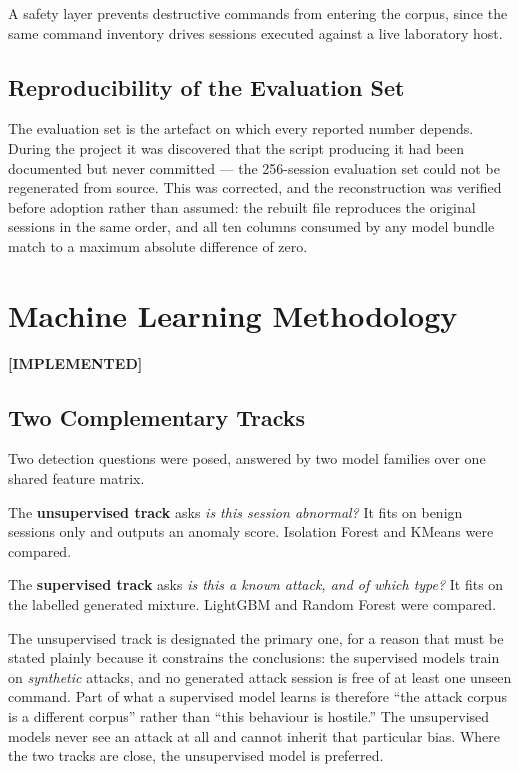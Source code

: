 \documentclass{classeENS}
\providecommand{\statusdone}{\textbf{[IMPLEMENTED]}}
\begin{document}
A safety layer prevents destructive commands from entering the corpus, since the same command inventory drives sessions executed against a live laboratory host.

\subsection{Reproducibility of the Evaluation Set}
The evaluation set is the artefact on which every reported number depends. During the project it was discovered that the script producing it had been documented but never committed --- the 256-session evaluation set could not be regenerated from source. This was corrected, and the reconstruction was verified before adoption rather than assumed: the rebuilt file reproduces the original sessions in the same order, and all ten columns consumed by any model bundle match to a maximum absolute difference of zero.

\section{Machine Learning Methodology}
\label{sec:ml}
\statusdone

\subsection{Two Complementary Tracks}
Two detection questions were posed, answered by two model families over one shared feature matrix.

The \textbf{unsupervised track} asks \emph{is this session abnormal?} It fits on benign sessions only and outputs an anomaly score. Isolation Forest and KMeans were compared.

The \textbf{supervised track} asks \emph{is this a known attack, and of which type?} It fits on the labelled generated mixture. LightGBM and Random Forest were compared.

The unsupervised track is designated the primary one, for a reason that must be stated plainly because it constrains the conclusions: the supervised models train on \emph{synthetic} attacks, and no generated attack session is free of at least one unseen command. Part of what a supervised model learns is therefore ``the attack corpus is a different corpus'' rather than ``this behaviour is hostile.'' The unsupervised models never see an attack at all and cannot inherit that particular bias. Where the two tracks are close, the unsupervised model is preferred.
\end{document}
